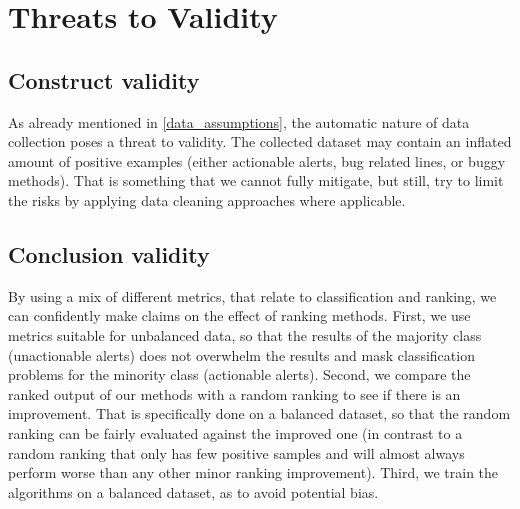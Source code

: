 
\section{Threats to Validity}\label{sec:threats}


\subsection{Construct validity}

As already mentioned in \cref{data_assumptions}, the automatic nature of data collection poses a threat to validity. The collected dataset may contain an inflated amount of positive examples (either actionable alerts, bug related lines, or buggy methods). That is something that we cannot fully mitigate, but still, try to limit the risks by applying data cleaning approaches where applicable.

\subsection{Conclusion validity}

By using a mix of different metrics, that relate to classification and ranking, we can confidently make claims on the effect of ranking methods. 
First, we use metrics suitable for unbalanced data, so that the results of the majority class (unactionable alerts) does not overwhelm the results and mask classification problems for the minority class (actionable alerts). Second, we compare the ranked output of our methods with a random ranking to see if there is an improvement. That is specifically done on a balanced dataset, so that the random ranking can be fairly evaluated against the improved one (in contrast to a random ranking that only has few positive samples and will almost always perform worse than any other minor ranking improvement). Third, we train the algorithms on a balanced dataset, as to avoid potential bias.


